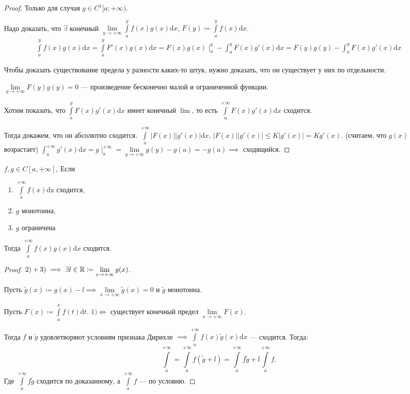 \begin{proof}
    Только для случая $g \in C^1[a; +\infty)$. 

    Надо доказать, что  $\exists$ конечный  $\lim\limits_{y \to +\infty} \int\limits_a^y f(x)g(x) \mathrm{d}x$,  $F(y) \coloneqq \int\limits_a^y f(x)\mathrm{d}x$. 
    \begin{align*}
        \int\limits_a^y f(x)g(x)\mathrm{d}x = \int\limits_a^y F'(x)g(x) \mathrm{d}x = F(x)g(x) \mid_a^y - \int_a^y F(x) g'(x) \mathrm{d}x = F(y)g(y) - \int_a^y F(x)g'(x) \mathrm{d}x
    \end{align*}

    Чтобы доказать существование предела у разности каких-то штук, нужно доказать, что он существует у них по отдельности.

    $\lim\limits_{y \to +\infty} F(y)g(y) = 0$ --- произведение бесконечно малой и ограниченной функции.

    Хотим показать, что $\int\limits_a^y F(x)g'(x)\mathrm{d}x$ имеет конечный  $\lim$, то есть  $\int\limits_a^{+\infty} F(x)g'(x) \mathrm{d}x$ сходится.

    Тогда докажем, что он абсолютно сходится.  $\int\limits_a^{+\infty} |F(x)| |g'(x)| \mathrm{d}x$, $|F(x)||g'(x)| \le K|g'(x)| = Kg'(x)$. (считаем, что $g(x)$ возрастает) $\int_a^{+\infty} g'(x) \mathrm{d}x = g \mid_a^{+\infty} = \lim\limits_{y \to +\infty} g(y) - g(a) = -g(a) \implies$ сходящийся.
\end{proof}
\begin{theorem}
    $f, g \in C[a, +\infty]$, Если 
     \begin{enumerate}
         \item $\int\limits_a^{+\infty} f(x) \mathrm{dx}$ сходится,
         \item  $g$ монотонна,
         \item  $g$ ограничена
    \end{enumerate}
    Тогда $\int\limits_a^{+\infty} f(x)g(x) \mathrm{d}x$ сходится.
\end{theorem}
\begin{proof}
    $2)+3) \implies \exists l \in \mathbb{R} \coloneqq \lim\limits_{x \to +\infty} g(x)$.

    Пусть $\widetilde{g}(x) \coloneqq g(x) - l \implies \lim\limits_{x \to +\infty}\widetilde{g}(x) = 0$ и  $\widetilde{g}$ монотонна.

    Пусть  $F(x) \coloneqq \int\limits_a^x f(t) \mathrm{d}t$.  $1) \iff$ существует конечный предел  $\lim\limits_{x \to +\infty} F(x)$.

    Тогда  $f$ и  $\widetilde{g}$ удовлетворяют условиям признака Дирихле $\implies \int\limits_a^{+\infty} f(x) \widetilde{g}(x) \mathrm{d}x$ --- сходится. Тогда: \[
    \int\limits_a^{+\infty} = \int\limits_a^{+\infty} f(\widetilde{g}+l) = \int\limits_a^{+\infty} f\widetilde{g} + l \int\limits_a^{+\infty} f
    .\] 
    Где $\int\limits_a^{+\infty} f\widetilde{g}$ сходится по доказанному, а  $\int\limits_a^{+\infty} f$ --- по условию.
\end{proof}
